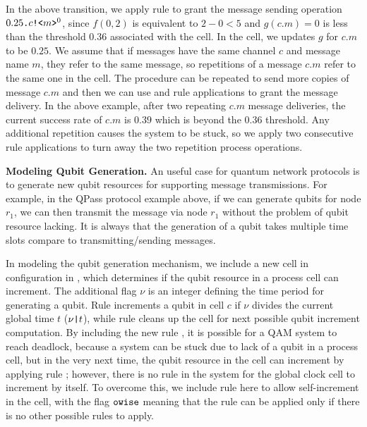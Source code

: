 In the above transition, we apply rule  to grant the message sending operation $0.25\texttt{.}c\texttt{!<}m\texttt{>}^0$, since $f(0,2)$ is equivalent to $2-0<5$ and $g(c.m)=0$ is less than the threshold $0.36$ associated with the  cell.
In the  cell, we updates $g$ for $c.m$ to be $0.25$.
We assume that if messages have the same channel $c$ and message name $m$, they refer to the same message,
so repetitions of a message $c.m$ refer to the same one in the  cell.
The procedure can be repeated to send more copies of message $c.m$ and then we can use  and  rule applications to grant the message delivery. In the above example, after two repeating $c.m$ message deliveries, the current success rate of $c.m$ is $0.39$ which is beyond the $0.36$ threshold. Any additional repetition causes the system to be stuck, so we apply two consecutive  rule applications to turn away the two repetition process operations. 

\noindent\textbf{Modeling Qubit Generation.}
An useful case for quantum network protocols is to generate new qubit resources for supporting message transmissions.
For example, in the QPass protocol example above, if we can generate qubits for node $r_1$, we can then transmit the message via node $r_1$ without the problem of qubit resource lacking.
It is always that the generation of a qubit takes multiple time slots compare to transmitting/sending messages.

In modeling the qubit generation mechanism, we include a new cell  in configuration  in ,
which determines if the qubit resource in a process cell can increment.
The additional flag $\nu$ is an integer defining the time period for generating a qubit.
Rule  increments a qubit in cell $c$ if $\nu$ divides the current global time $t$ ($\nu \texttt{|} t$),
while rule  cleans up the  cell for next possible qubit increment computation.
By including the new rule , it is possible for a QAM system to reach deadlock,
because a system can be stuck due to lack of a qubit in a process cell, but in the very next time, the qubit resource in the cell can increment by applying rule ; however, there is no rule in the system for the global clock cell  to increment by itself.
To overcome this, we include rule  here to allow self-increment in the  cell, 
with the flag $\texttt{owise}$ meaning that the rule can be applied only if there is no other possible rules to apply.






